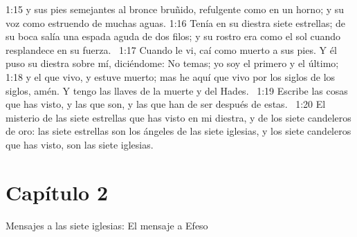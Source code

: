 1:15 y sus pies semejantes al bronce bruñido, refulgente como en un horno; y su voz como estruendo de muchas aguas. 
1:16 Tenía en su diestra siete estrellas; de su boca salía una espada aguda de dos filos; y su rostro era como el sol cuando resplandece en su fuerza.  
1:17 Cuando le vi, caí como muerto a sus pies. Y él puso su diestra sobre mí, diciéndome: No temas; yo soy el primero y el último; 
1:18 y el que vivo, y estuve muerto; mas he aquí que vivo por los siglos de los siglos, amén. Y tengo las llaves de la muerte y del Hades.  
1:19 Escribe las cosas que has visto, y las que son, y las que han de ser después de estas.  
1:20 El misterio de las siete estrellas que has visto en mi diestra, y de los siete candeleros de oro: las siete estrellas son los ángeles de las siete iglesias, y los siete candeleros que has visto, son las siete iglesias.  
\section*{Capítulo 2}
Mensajes a las siete iglesias: El mensaje a Efeso  

